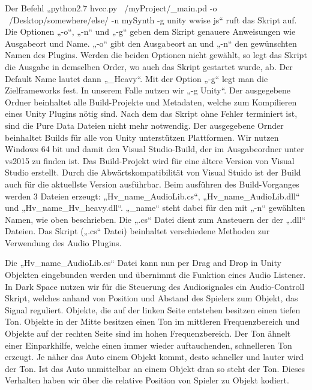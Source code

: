 \documentclass[a4paper, 11pt]{scrartcl}
\begin{document}
Der Befehl „python2.7 hvcc.py ~/myProject/\_main.pd -o ~/Desktop/somewhere/else/
-n mySynth -g unity wwise js“ ruft das Skript auf. Die Optionen „-o“, „-n“ und
„-g“ geben dem Skript genauere Anweisungen wie Ausgabeort und Name.  „-o“ gibt
den Ausgabeort an und „-n“ den gewünschten Namen des Plugins. Werden die beiden
Optionen nicht gewählt, so legt das Skript die Ausgabe in demselben Order, wo
auch das Skript gestartet wurde, ab. Der Default Name lautet dann „\_Heavy“. Mit
der Option „-g“ legt man die Zielframeworks fest. In unserem Falle nutzen wir
„-g Unity“. Der ausgegebene Ordner beinhaltet alle Build-Projekte und Metadaten,
welche zum Kompilieren eines Unity Plugins nötig sind. Nach dem das Skript ohne
Fehler terminiert ist, sind die Pure Data Dateien nicht mehr notwendig. Der
ausgegebene Ornder beinhaltet Builds für alle von Unity unterstützen
Plattformen. Wir nutzen Windows 64 bit und damit den Visual Studio-Build, der im
Ausgabeordner unter vs2015 zu finden ist. Das Build-Projekt wird für eine ältere
Version von Visual Studio erstellt. Durch die Abwärtskompatibilität von Visual
Stuido ist der Build auch für die aktuellste Version ausführbar.  Beim ausführen
des Build-Vorganges werden 3 Dateien erzeugt: „Hv\_name\_AudioLib.cs“,
„Hv\_name\_AudioLib.dll“ und „Hv\_name\_Hv\_heavy.dll“.  „\_name“ steht dabei
für den mit „-n“ gewählten Namen, wie oben beschrieben.  Die „.cs“ Datei dient
zum Ansteuern der der „.dll“ Dateien. Das Skript („.cs“ Datei) beinhaltet
verschiedene Methoden zur Verwendung des Audio Plugins. 

Die „Hv\_name\_AudioLib.cs“ Datei kann nun per Drag and Drop in Unity Objekten
eingebunden werden und übernimmt die Funktion eines Audio Listener.
In Dark Space nutzen wir für die Steuerung des Audiosignales ein Audio-Controll Skript, welches anhand von Position und Abstand des Spielers zum Objekt, das Signal reguliert. Objekte, die auf der linken Seite entstehen besitzen einen tiefen Ton. Objekte in der Mitte besitzen einen Ton im mittleren Frequenzbereich und Objekte auf der rechten Seite sind im hohen Frequenzbereich. Der Ton ähnelt einer Einparkhilfe, welche einen immer wieder auftauchenden, schnelleren Ton erzeugt. Je näher das Auto einem Objekt kommt, desto schneller und lauter wird der Ton. Ist das Auto unmittelbar an einem Objekt dran so steht der Ton. Dieses Verhalten haben wir über die relative Position von Spieler zu Objekt kodiert. 
\end{document}
